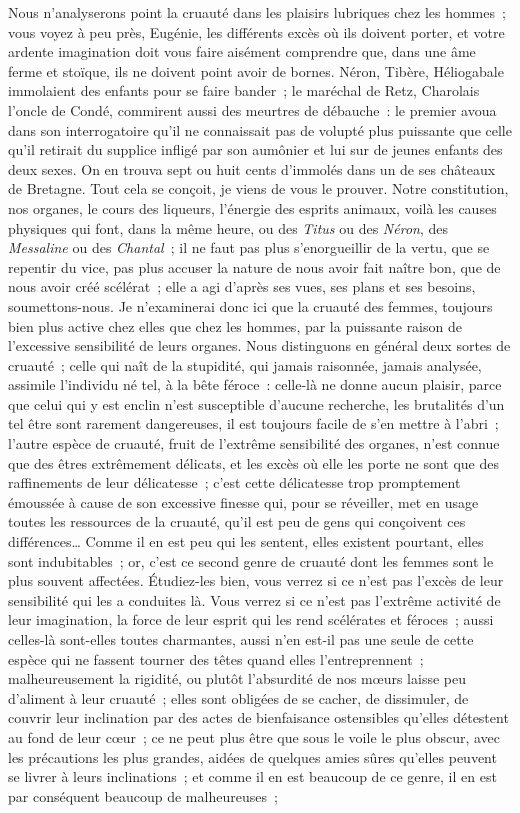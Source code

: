 \documentclass[french,twoside]{book} %
\begin{document}
Nous n’analyserons point la cruauté dans les plaisirs lubriques chez les hommes ; vous voyez à peu près, Eugénie, les différents excès où ils doivent porter, et votre ardente imagination doit vous faire aisément comprendre que, dans une âme ferme et stoïque, ils ne doivent point avoir de bornes. Néron, Tibère, Héliogabale immolaient des enfants pour se faire bander ; le maréchal de Retz, Charolais l’oncle de Condé, commirent aussi des meurtres de débauche : le premier avoua dans son interrogatoire qu’il ne connaissait pas de volupté plus puissante que celle qu’il retirait du supplice infligé par son aumônier et lui sur de jeunes enfants des deux sexes. On en trouva sept ou huit cents d’immolés dans un de ses châteaux de Bretagne. Tout cela se conçoit, je viens de vous le prouver. Notre constitution, nos organes, le cours des liqueurs, l’énergie des esprits animaux, voilà les causes physiques qui font, dans la même heure, ou des {\itshape Titus} ou des {\itshape Néron}, des {\itshape Messaline} ou des {\itshape Chantal} ; il ne faut pas plus s’enorgueillir de la vertu, que se repentir du vice, pas plus accuser la nature de nous avoir fait naître bon, que de nous avoir créé scélérat ; elle a agi d’après ses vues, ses plans et ses besoins, soumettons-nous. Je n’examinerai donc ici que la cruauté des femmes, toujours bien plus active chez elles que chez les hommes, par la puissante raison de l’excessive sensibilité de leurs organes. Nous distinguons en général deux sortes de cruauté ; celle qui naît de la stupidité, qui jamais raisonnée, jamais analysée, assimile l’individu né tel, à la bête féroce : celle-là ne donne aucun plaisir, parce que celui qui y est enclin n’est susceptible d’aucune recherche, les brutalités d’un tel être sont rarement dangereuses, il est toujours facile de s’en mettre à l’abri ; l’autre espèce de cruauté, fruit de l’extrême sensibilité des organes, n’est connue que des êtres extrêmement délicats, et les excès où elle les porte ne sont que des raffinements de leur délicatesse ; c’est cette délicatesse trop promptement émoussée à cause de son excessive finesse qui, pour se réveiller, met en usage toutes les ressources de la cruauté, qu’il est peu de gens qui conçoivent ces différences… Comme il en est peu qui les sentent, elles existent pourtant, elles sont indubitables ; or, c’est ce second genre de cruauté dont les femmes sont le plus souvent affectées. Étudiez-les bien, vous verrez si ce n’est pas l’excès de leur sensibilité qui les a conduites là. Vous verrez si ce n’est pas l’extrême activité de leur imagination, la force de leur esprit qui les rend scélérates et féroces ; aussi celles-là sont-elles toutes charmantes, aussi n’en est-il pas une seule de cette espèce qui ne fassent tourner des têtes quand elles l’entreprennent ; malheureusement la rigidité, ou plutôt l’absurdité de nos mœurs laisse peu d’aliment à leur cruauté ; elles sont obligées de se cacher, de dissimuler, de couvrir leur inclination par des actes de bienfaisance ostensibles qu’elles détestent au fond de leur cœur ; ce ne peut plus être que sous le voile le plus obscur, avec les précautions les plus grandes, aidées de quelques amies sûres qu’elles peuvent se livrer à leurs inclinations ; et comme il en est beaucoup de ce genre, il en est par conséquent beaucoup de malheureuses ; 
\end{document}
